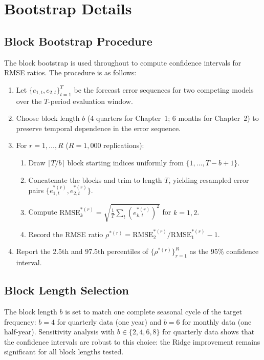 \section{Bootstrap Details}
\label{app:bootstrap}

\subsection{Block Bootstrap Procedure}

The block bootstrap \citep{kunsch1989jackknife} is used throughout to compute confidence intervals for RMSE ratios.  The procedure is as follows:

\begin{enumerate}
  \item Let $\{e_{1,t}, e_{2,t}\}_{t=1}^{T}$ be the forecast error sequences for two competing models over the $T$-period evaluation window.
  \item Choose block length $b$ (4 quarters for Chapter~1; 6 months for Chapter~2) to preserve temporal dependence in the error sequence.
  \item For $r = 1, \ldots, R$ ($R = 1{,}000$ replications):
    \begin{enumerate}
      \item Draw $\lceil T/b \rceil$ block starting indices uniformly from $\{1, \ldots, T - b + 1\}$.
      \item Concatenate the blocks and trim to length $T$, yielding resampled error pairs $\{e_{1,t}^{*(r)}, e_{2,t}^{*(r)}\}$.
      \item Compute $\text{RMSE}^{*(r)}_k = \sqrt{\frac{1}{T} \sum_t (e_{k,t}^{*(r)})^2}$ for $k = 1, 2$.
      \item Record the RMSE ratio $\rho^{*(r)} = \text{RMSE}^{*(r)}_2 / \text{RMSE}^{*(r)}_1 - 1$.
    \end{enumerate}
  \item Report the 2.5th and 97.5th percentiles of $\{\rho^{*(r)}\}_{r=1}^{R}$ as the 95\% confidence interval.
\end{enumerate}

\subsection{Block Length Selection}

The block length $b$ is set to match one complete seasonal cycle of the target frequency: $b = 4$ for quarterly data (one year) and $b = 6$ for monthly data (one half-year).  Sensitivity analysis with $b \in \{2, 4, 6, 8\}$ for quarterly data shows that the confidence intervals are robust to this choice: the Ridge improvement remains significant for all block lengths tested.


